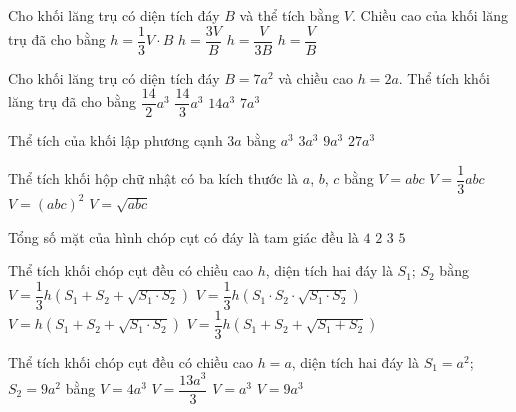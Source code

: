 \begin{ex}%
	Cho khối lăng trụ có diện tích đáy $B$ và thể tích bằng $V$. Chiều cao của khối lăng trụ đã cho bằng
	\choice
	{$h=\dfrac{1}{3}V\cdot B$}
	{$h=\dfrac{3V}{B}$}
	{$h=\dfrac{V}{3B}$}
	{\True $h=\dfrac{V}{B}$}
\end{ex}
\begin{ex}%
	Cho khối lăng trụ có diện tích đáy $B=7a^2$ và chiều cao $h=2a$. Thể tích khối lăng trụ đã cho bằng  
	\choice
	{$\dfrac{14}{2}a^3$}
	{$\dfrac{14}{3}a^3$}
	{\True $14a^3$}
	{$7a^3$}
\end{ex}
\begin{ex}%
	Thể tích của khối lập phương cạnh $3a$ bằng
	\choice
	{$a^3$}
	{$3a^3$}
	{$9a^3$}
	{\True $27a^3$}
\end{ex}
\begin{ex}%
	Thể tích khối hộp chữ nhật có ba kích thước là $a$, $b$, $c$ bằng
	\choice
	{\True $V=abc$}
	{$V=\dfrac{1}{3}abc$}
	{$V=\left( abc \right)^2$}
	{$V=\sqrt{abc}$}
\end{ex}
\begin{ex}%
	Tổng số mặt của hình chóp cụt có đáy là tam giác đều là
	\choice
	{$4$}
	{$2$}
	{$3$}
	{\True $5$}
\end{ex}
\begin{ex}%
	Thể tích khối chóp cụt đều có chiều cao $h$, diện tích hai đáy là $S_1$; $S_2$ bằng
	\choice
	{\True $V=\dfrac{1}{3}h\left( S_1+S_2+\sqrt{S_1\cdot S_2} \right)$}
	{$V=\dfrac{1}{3}h\left( S_1\cdot S_2\cdot \sqrt{S_1\cdot S_2} \right)$}
	{$V=h\left( S_1+S_2+\sqrt{S_1\cdot S_2} \right)$}
	{$V=\dfrac{1}{3}h\left( S_1+S_2+\sqrt{S_1+S_2} \right)$}
\end{ex}
\begin{ex}%
	Thể tích khối chóp cụt đều có chiều cao $h=a$, diện tích hai đáy là $S_1=a^2$; $S_2=9a^2$ bằng
	\choice
	{$V=4a^3$}
	{\True $V=\dfrac{13a^3}{3}$}
	{$V=a^3$}
	{$V=9a^3$}
\end{ex}

